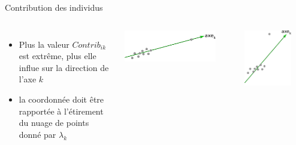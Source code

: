 \documentclass{beamer}
\begin{document}
\begin{frame}{Contribution des individus}

\vspace{1.5cm}



\begin{columns}[T,onlytextwidth]

\begin{itemize}

\item Plus la valeur $Contrib_{ik}$ est extrême, plus elle influe sur la direction de l'axe $k$
\item la coordonnée doit être rapportée à  l'étirement du nuage de points donné par  $\lambda_k$
\end{itemize}

\colorbox{white}{\includegraphics[width=0.85\textwidth,keepaspectratio]{img/contribution_indiv_axe.png}}

\vspace{0.5cm}

\colorbox{white}{\includegraphics[width=0.75\textwidth,keepaspectratio]{img/contribution_indiv_axe2.png}}

\end{columns}

\end{frame}
\end{document}
